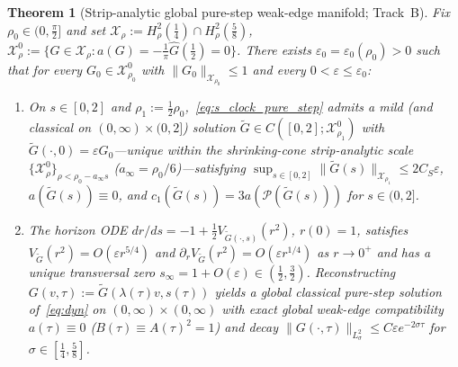 \documentclass[11pt,a4paper]{article}
\newtheorem{thm}{Theorem}
\begin{document}
\begin{thm}[Strip-analytic global pure-step weak-edge manifold; Track~B]\label{thm:track_b}
Fix $\rho_0\in(0,\frac{\pi}{2}]$ and set $\mathcal{X}_\rho:=H^2_\rho(\tfrac14)\cap H^2_\rho(\tfrac58)$,
$\mathcal{X}_\rho^0:=\{G\in\mathcal{X}_\rho : a(G)=-\tfrac{1}{\pi}\widehat G(\tfrac12)=0\}$.
There exists $\varepsilon_0=\varepsilon_0(\rho_0)>0$ such that for every $G_0\in\mathcal{X}_{\rho_0}^0$
with $\|G_0\|_{\mathcal{X}_{\rho_0}}\le 1$ and every $0<\varepsilon\le\varepsilon_0$:
\begin{enumerate}
\item On $s\in[0,2]$ and $\rho_1:=\tfrac12\rho_0$,~\eqref{eq:s_clock_pure_step} admits a mild
  (and classical on $(0,\infty)\times(0,2]$) solution $\widetilde G\in C([0,2];\mathcal{X}_{\rho_1}^0)$
  with $\widetilde G(\cdot,0)=\varepsilon G_0$---unique within the shrinking-cone strip-analytic scale
  $\{\mathcal{X}_\rho^0\}_{\rho<\rho_0-a_\infty s}$ ($a_\infty=\rho_0/6$)---satisfying
  $\sup_{s\in[0,2]}\|\widetilde G(s)\|_{\mathcal{X}_{\rho_1}}\le 2C_S\varepsilon$,
  $a(\widetilde G(s))\equiv 0$, and $c_1(\widetilde G(s))=3a(\mathcal{P}(\widetilde G(s)))$ for $s\in(0,2]$.
\item The horizon ODE $dr/ds=-1+\tfrac12 V_{\widetilde G(\cdot,s)}(r^2)$, $r(0)=1$, satisfies
  $V_{\widetilde G}(r^2)=O(\varepsilon r^{5/4})$ and $\partial_r V_{\widetilde G}(r^2)=O(\varepsilon r^{1/4})$
  as $r\to 0^+$ and has a unique transversal zero $s_\infty=1+O(\varepsilon)\in(\frac12,\frac32)$.
  Reconstructing $G(v,\tau):=\widetilde G(\lambda(\tau)v,s(\tau))$ yields a global classical pure-step
  solution of~\eqref{eq:dyn} on $(0,\infty)\times(0,\infty)$ with exact global weak-edge compatibility
  $a(\tau)\equiv 0$ ($B(\tau)\equiv A(\tau)^2=1$) and decay
  $\|G(\cdot,\tau)\|_{L^2_\sigma}\le C\varepsilon e^{-2\sigma\tau}$ for $\sigma\in[\tfrac14,\tfrac58]$.
\end{enumerate}
\end{thm}
\end{document}
